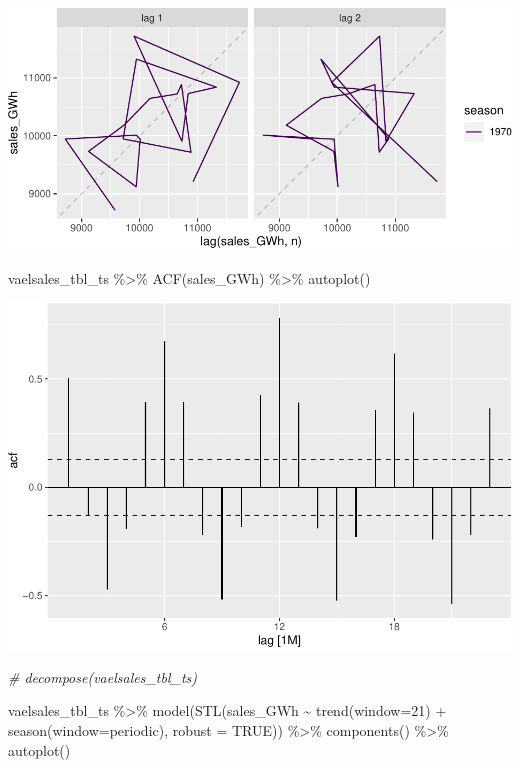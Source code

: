 \documentclass[
]{book}
\newenvironment{Shaded}{\begin{snugshade}}{\end{snugshade}}
\newcommand{\AttributeTok}[1]{\textcolor[rgb]{0.77,0.63,0.00}{#1}}
\newcommand{\CommentTok}[1]{\textcolor[rgb]{0.56,0.35,0.01}{\textit{#1}}}
\newcommand{\ConstantTok}[1]{\textcolor[rgb]{0.00,0.00,0.00}{#1}}
\newcommand{\DecValTok}[1]{\textcolor[rgb]{0.00,0.00,0.81}{#1}}
\newcommand{\FunctionTok}[1]{\textcolor[rgb]{0.00,0.00,0.00}{#1}}
\newcommand{\NormalTok}[1]{#1}
\newcommand{\SpecialCharTok}[1]{\textcolor[rgb]{0.00,0.00,0.00}{#1}}
\newcommand{\StringTok}[1]{\textcolor[rgb]{0.31,0.60,0.02}{#1}}
\begin{document}
\includegraphics{graphics/plot lagged values-2.pdf}

\begin{Shaded}
\begin{Highlighting}[]
\NormalTok{vaelsales\_tbl\_ts }\SpecialCharTok{\%\textgreater{}\%} \FunctionTok{ACF}\NormalTok{(sales\_GWh) }\SpecialCharTok{\%\textgreater{}\%} \FunctionTok{autoplot}\NormalTok{()}
\end{Highlighting}
\end{Shaded}

\includegraphics{graphics/unnamed-chunk-50-1.pdf}

\begin{Shaded}
\begin{Highlighting}[]
\CommentTok{\# decompose(vaelsales\_tbl\_ts)}
\end{Highlighting}
\end{Shaded}

\begin{Shaded}
\begin{Highlighting}[]
\NormalTok{vaelsales\_tbl\_ts }\SpecialCharTok{\%\textgreater{}\%}
  \FunctionTok{model}\NormalTok{(}\FunctionTok{STL}\NormalTok{(sales\_GWh }\SpecialCharTok{\textasciitilde{}} \FunctionTok{trend}\NormalTok{(}\AttributeTok{window=}\DecValTok{21}\NormalTok{) }\SpecialCharTok{+} \FunctionTok{season}\NormalTok{(}\AttributeTok{window=}\StringTok{\textquotesingle{}periodic\textquotesingle{}}\NormalTok{), }\AttributeTok{robust =} \ConstantTok{TRUE}\NormalTok{)) }\SpecialCharTok{\%\textgreater{}\%}
  \FunctionTok{components}\NormalTok{() }\SpecialCharTok{\%\textgreater{}\%}
  \FunctionTok{autoplot}\NormalTok{()}
\end{Highlighting}
\end{Shaded}
\end{document}
